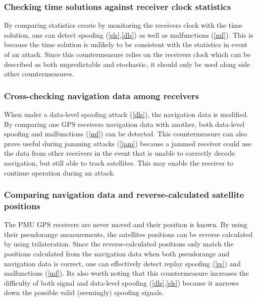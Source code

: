 \documentclass[12pt,english,a4paper]{article}
\begin{document}
\subsubsection{Checking time solutions against receiver clock statistics}\label{ctsarcs} %
By comparing statistics create by monitoring the receivers clock with the time solution, one can detect spoofing (\ref{sls},\ref{dls}) as well as malfunctions (\ref{mf}). This is because the time solution is unlikely to be consistent with the statistics in event of an attack. Since this countermeasure relies on the receivers clock which can be described as both unpredictable and stochastic, it should only be used along side other countermeasures.\cite{HengChouGao14}    


\subsubsection{Cross-checking navigation data among receivers}\label{ccndar} %
When under a data-level spoofing attack (\ref{dls}), the navigation data is modified. By comparing one GPS receivers navigation data with another, both data-level spoofing and malfunctions (\ref{mf}) can be detected. This countermeasure can also prove useful during jamming attacks (\ref{jam}) because a jammed receiver could use the data from other receivers in the event that is unable to correctly decode navigation, but still able to track satellites. This may enable the receiver to continue operation during an attack. \cite{HengChouGao14}  

\subsubsection{Comparing navigation data and reverse-calculated satellite positions}\label{cndrcsp} %
The PMU GPS receivers are never moved and their position is known. By using their pseudorange measurements, the satellites positions can be reverse calculated by using trilateration. Since the reverse-calculated positions only match the positions calculated from the navigation data when both pseudorange and navigation data is correct, one can effectively detect replay spoofing (\ref{rs}) and malfunctions (\ref{mf}). Its also worth noting that this countermeasure increases the difficulty of both signal and data-level spoofing (\ref{dls},\ref{sls}) because it narrows down the possible valid (seemingly) spoofing signals. \cite{HengChouGao14} 
\end{document}
